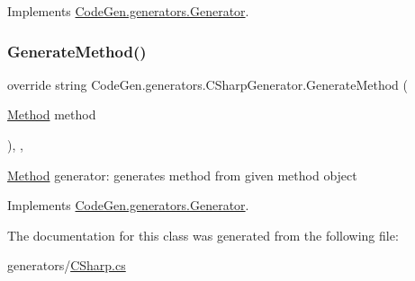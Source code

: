 Implements \mbox{\hyperlink{classCodeGen_1_1generators_1_1Generator_a0d1a48aedbca08c05af734a43739d1c3}{Code\+Gen.\+generators.\+Generator}}.

\mbox{\label{classCodeGen_1_1generators_1_1CSharpGenerator_af39766dfe9c70d55091f7b8812bf8399}} 
\subsubsection{\texorpdfstring{Generate\+Method()}{GenerateMethod()}}
{\footnotesize\ttfamily override string Code\+Gen.\+generators.\+C\+Sharp\+Generator.\+Generate\+Method (\begin{DoxyParamCaption}\item[{\mbox{\hyperlink{classCodeGen_1_1generators_1_1Method}{Method}}}]{method }\end{DoxyParamCaption})\hspace{0.3cm}{\ttfamily [inline]}, {\ttfamily [protected]}, {\ttfamily [virtual]}}



\mbox{\hyperlink{classCodeGen_1_1generators_1_1Method}{Method}} generator\+: generates method from given method object  



Implements \mbox{\hyperlink{classCodeGen_1_1generators_1_1Generator_a04fc9bd217b3b8c3d5f7b1a3f92c79d3}{Code\+Gen.\+generators.\+Generator}}.



The documentation for this class was generated from the following file\+:\begin{DoxyCompactItemize}
\item 
generators/\mbox{\hyperlink{CSharp_8cs}{C\+Sharp.\+cs}}\end{DoxyCompactItemize}
